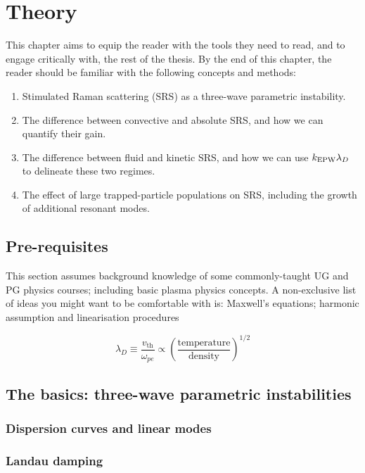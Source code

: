 \chapter{Theory}
\label{chp:theory}

This chapter aims to equip the reader with the tools they need to read, and to engage critically with, the rest of the thesis. By the end of this chapter, the reader should be familiar with the following concepts and methods:
\begin{enumerate}
	\item Stimulated Raman scattering (\acrshort{SRS}) as a three-wave parametric instability.
	\item The difference between convective and absolute SRS, and how we can quantify their gain.
	\item The difference between fluid and kinetic SRS, and how we can use $k_\mathrm{EPW}\lambda_D$ to delineate these two regimes.
	\item The effect of large trapped-particle populations on SRS, including the growth of additional resonant modes.
\end{enumerate}


\section{Pre-requisites}
This section assumes background knowledge of some commonly-taught UG and PG physics courses; including basic plasma physics concepts. A non-exclusive list of ideas you might want to be comfortable with is: Maxwell's equations; harmonic assumption and linearisation procedures

\begin{equation}
	\lambda_D \equiv \frac{v_{\mathrm{th}}}{\omega_{pe}} \propto \left(\frac{\mathrm{temperature}}{\mathrm{density}}\right)^{1/2}
\end{equation}\label{eqn:debye}

\section{The basics: three-wave parametric instabilities}

\subsection{Dispersion curves and linear modes}

\subsection{Landau damping}

